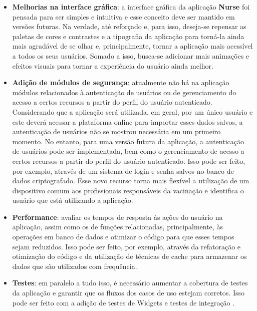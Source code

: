 \begin{itemize}
  \item \textbf{Melhorias na interface gráfica}: a interface gráfica da aplicação \textbf{Nurse} foi pensada para ser simples e intuitiva e esse conceito deve ser mantido em versões futuras. Na verdade, até reforçado e, para isso, deseja-se repensar as paletas de cores e contrastes e a tipografia da aplicação para torná-la ainda mais agradável de se olhar e, principalmente, tornar a aplicação mais acessível a todos os seus usuários. Somado a isso, busca-se adicionar mais animações e efeitos visuais para tornar a experiência do usuário ainda melhor.
  \item \textbf{Adição de módulos de segurança}: atualmente não há na aplicação módulos relacionados à autenticação de usuários ou de gerenciamento do acesso a certos recursos a partir do perfil do usuário autenticado. Considerando que a aplicação será utilizada, em geral, por um único usuário e este deverá acessar a plataforma online para importar esses dados salvos, a autenticação de usuários não se mostrou necessária em um primeiro momento. No entanto, para uma versão futura da aplicação, a autenticação de usuários pode ser implementada, bem como o gerenciamento de acesso a certos recursos a partir do perfil do usuário autenticado. Isso pode ser feito, por exemplo, através de um sistema de login e senha salvos no banco de dados criptografado. Esse novo recurso torna mais flexível a utilização de um dispositivo comum aos profissionais responsáveis da vacinação e identifica o usuário que está utilizando a aplicação.
  \item \textbf{Performance}: avaliar os tempos de resposta às ações do usuário na aplicação, assim como os de funções relacionadas, principalmente, às operações em banco de dados e otimizar o código para que esses tempos sejam reduzidos. Isso pode ser feito, por exemplo, através da refatoração e otimização do código e da utilização de técnicas de cache para armazenar os dados que são utilizados com frequência.
  \item \textbf{Testes}: em paralelo a tudo isso, é necessário aumentar a cobertura de testes da aplicação e garantir que os fluxos dos casos de uso estejam corretos. Isso pode ser feito com a adição de testes de Widgets e testes de integração \cite{flutter-testing}.
\end{itemize}


